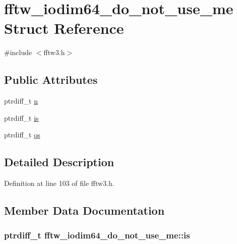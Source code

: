 \hypertarget{structfftw__iodim64__do__not__use__me}{\section{fftw\-\_\-iodim64\-\_\-do\-\_\-not\-\_\-use\-\_\-me Struct Reference}
\label{structfftw__iodim64__do__not__use__me}
}


{\ttfamily \#include $<$fftw3.\-h$>$}

\subsection*{Public Attributes}
\begin{DoxyCompactItemize}
\item 
ptrdiff\-\_\-t \hyperlink{structfftw__iodim64__do__not__use__me_a19f8739d839b44db63c3aa1696a3a038}{n}
\item 
ptrdiff\-\_\-t \hyperlink{structfftw__iodim64__do__not__use__me_a1b9164674e2d091e8bde88c8d1bb7b6e}{is}
\item 
ptrdiff\-\_\-t \hyperlink{structfftw__iodim64__do__not__use__me_a44118d774124bdaa670f640537b151cf}{os}
\end{DoxyCompactItemize}


\subsection{Detailed Description}


Definition at line 103 of file fftw3.\-h.



\subsection{Member Data Documentation}
\hypertarget{structfftw__iodim64__do__not__use__me_a1b9164674e2d091e8bde88c8d1bb7b6e}{
\subsubsection[{is}]{\setlength{\rightskip}{0pt plus 5cm}ptrdiff\-\_\-t fftw\-\_\-iodim64\-\_\-do\-\_\-not\-\_\-use\-\_\-me\-::is}}\label{structfftw__iodim64__do__not__use__me_a1b9164674e2d091e8bde88c8d1bb7b6e}


